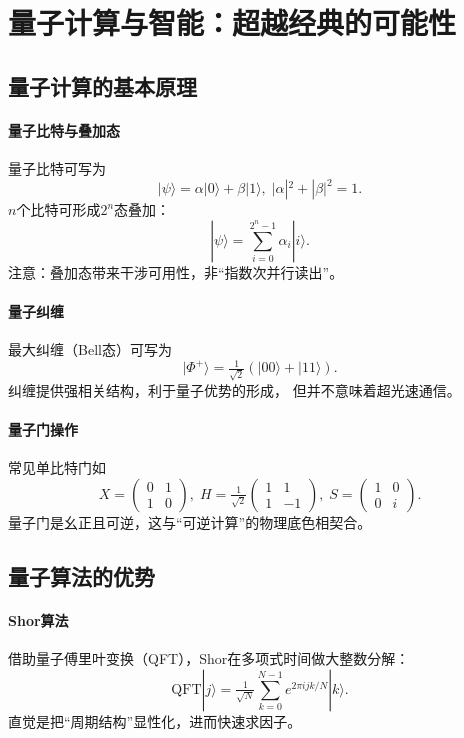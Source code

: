 \section{量子计算与智能：超越经典的可能性}

\subsection{量子计算的基本原理}

\paragraph{量子比特与叠加态}
量子比特可写为
$$|\psi\rangle=\alpha|0\rangle+\beta|1\rangle,\;|\alpha|^2+|\beta|^2=1.$$
$n$个比特可形成$2^n$态叠加：
$$|\psi\rangle=\sum_{i=0}^{2^n-1}\alpha_i|i\rangle.$$
注意：叠加态带来干涉可用性，非“指数次并行读出”。

\paragraph{量子纠缠}
最大纠缠（Bell态）可写为
$$|\Phi^+\rangle=\tfrac{1}{\sqrt{2}}(|00\rangle+|11\rangle).$$
纠缠提供强相关结构，利于量子优势的形成，  
但并不意味着超光速通信。

\paragraph{量子门操作}
常见单比特门如
$$X=\begin{pmatrix}0&1\\1&0\end{pmatrix},\;
H=\tfrac{1}{\sqrt{2}}\begin{pmatrix}1&1\\1&-1\end{pmatrix},\;
S=\begin{pmatrix}1&0\\0&i\end{pmatrix}.$$
量子门是幺正且可逆，这与“可逆计算”的物理底色相契合。

\subsection{量子算法的优势}

\paragraph{Shor算法}
借助量子傅里叶变换（QFT），Shor在多项式时间做大整数分解：
$$\mathrm{QFT}|j\rangle=\tfrac{1}{\sqrt{N}}\sum_{k=0}^{N-1}e^{2\pi ijk/N}|k\rangle.$$
直觉是把“周期结构”显性化，进而快速求因子。

